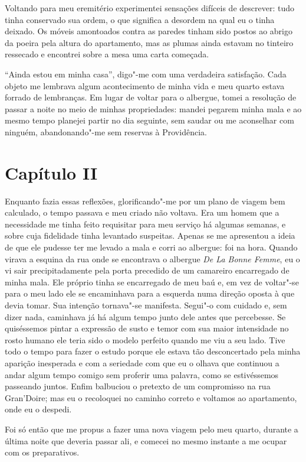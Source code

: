 Voltando para meu eremitério experimentei sensações difíceis de
descrever: tudo tinha conservado sua ordem, o que significa a desordem
na qual eu o tinha deixado. Os móveis amontoados contra as paredes
tinham sido postos ao abrigo da poeira pela altura do apartamento, mas
as plumas ainda estavam no tinteiro ressecado e encontrei sobre a mesa
uma carta começada.

``Ainda estou em minha casa'', digo"-me com uma verdadeira satisfação. Cada
objeto me lembrava algum acontecimento de minha vida e meu quarto
estava forrado de lembranças. Em lugar de voltar para o albergue, tomei
a resolução de passar a noite no meio de minhas propriedades: mandei
pegarem minha mala e ao mesmo tempo planejei partir no dia seguinte,
sem saudar ou me aconselhar com ninguém, abandonando"-me sem reservas à
Providência.

\section*{Capítulo II}

 Enquanto fazia essas reflexões, glorificando"-me por um plano de viagem
bem calculado, o tempo passava e meu criado não voltava. Era um homem
que a necessidade me tinha feito requisitar para meu serviço há algumas
semanas, e sobre cuja fidelidade tinha levantado suspeitas. Apenas se
me apresentou a ideia de que ele pudesse ter me levado a mala e corri
ao albergue: foi na hora. Quando virava a esquina da rua onde se
encontrava o albergue \textit{De La Bonne Femme}, eu o vi sair
precipitadamente pela porta precedido de um camareiro encarregado de
minha mala. Ele próprio tinha se encarregado de meu baú e, em vez de
voltar"-se para o meu lado ele se encaminhava para a esquerda numa
direção oposta à que devia tomar. Sua intenção tornava"-se manifesta.
Segui"-o com cuidado e, sem dizer nada, caminhava já há algum tempo
junto dele antes que percebesse. Se quiséssemos pintar a expressão de
susto e temor com sua maior intensidade no rosto humano ele teria sido
o modelo perfeito quando me viu a seu lado. Tive todo o tempo para
fazer o estudo porque ele estava tão desconcertado pela minha aparição
inesperada e com a seriedade com que eu o olhava que continuou a andar
algum tempo comigo sem proferir uma palavra, como se estivéssemos
passeando juntos. Enfim balbuciou o pretexto de um compromisso na rua
Gran’Doire; mas eu o recoloquei no caminho correto e voltamos ao
apartamento, onde eu o despedi.

 Foi só então que me propus a fazer uma nova viagem pelo meu quarto,
durante a última noite que deveria passar ali, e comecei no mesmo
instante a me ocupar com os preparativos. 

